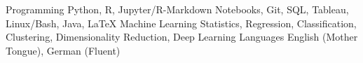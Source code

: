 
  \begin{cvskills}
    \cvskill
      {Programming} %
      {Python, R, Jupyter/R-Markdown Notebooks, Git, SQL, Tableau, Linux/Bash, Java, LaTeX} %
    \cvskill
      {Machine Learning} %
      {Statistics, Regression, Classification, Clustering, Dimensionality Reduction, Deep Learning} %
    \cvskill
      {Languages} %
      {English (Mother Tongue), German (Fluent)} %

 \end{cvskills}
